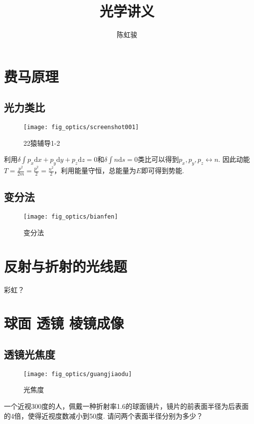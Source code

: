 \documentclass[a4paper]{article}
\title{光学讲义}
\author{陈虹骏}
\begin{document}
	\maketitle

	\section{费马原理}
	\subsection{光力类比}
	
	\begin{figure}[h]
		\centering
		\texttt{[image: fig\_optics/screenshot001]}
		\caption{22猿辅导1-2}
		\label{fig:screenshot001}
	\end{figure}
	
	利用$\delta \int p_x \mathrm{d} x + p_y \mathrm{d} y +p_z \mathrm{d} z =0$和$\delta \int n \mathrm{d}s=0$类比可以得到$p_x, p_y, p_z \leftrightarrow n$. 因此动能$T=\frac{p^2}{2m}=\frac{p^2}{2}=\frac{n^2}{2}$，利用能量守恒，总能量为$E$即可得到势能.
	
	\subsection{变分法}
	
	\begin{figure}[H]
		\centering
		\texttt{[image: fig\_optics/bianfen]}
		\caption{变分法}
		\label{fig:bianfen}
	\end{figure}
	
	\section{反射与折射的光线题}
	彩虹？
	
	\section{球面 透镜 棱镜成像}
	\subsection{透镜光焦度}
	\begin{figure}[H]
		\centering
		\texttt{[image: fig\_optics/guangjiaodu]}
		\caption{光焦度}
		\label{fig:guangjiaodu}
	\end{figure}
	
	\begin{framed}
		一个近视300度的人，佩戴一种折射率1.6的球面镜片，镜片的前表面半径为后表面的4倍，使得近视度数减小到50度. 请问两个表面半径分别为多少？
	\end{framed}
	
\end{document}
